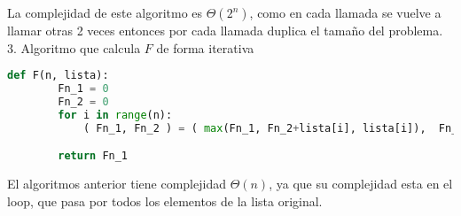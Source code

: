 \documentclass[
	spanish, %
	letterpaper, oneside
]{article}
\begin{document}
La complejidad de este algoritmo es $\Theta(2^n)$, como en cada llamada se vuelve a llamar otras 2 veces entonces por cada llamada duplica el tamaño del problema.\\


3. Algoritmo que calcula $F$ de forma iterativa

\begin{lstlisting}[language=Python]
    def F(n, lista):
        Fn_1 = 0
        Fn_2 = 0
        for i in range(n):
            ( Fn_1, Fn_2 ) = ( max(Fn_1, Fn_2+lista[i], lista[i]),  Fn_1 )

        return Fn_1

\end{lstlisting}
El algoritmos anterior tiene complejidad $\Theta(n)$, ya que su complejidad esta en el loop, que pasa por todos los elementos de la lista original.

\end{document}
